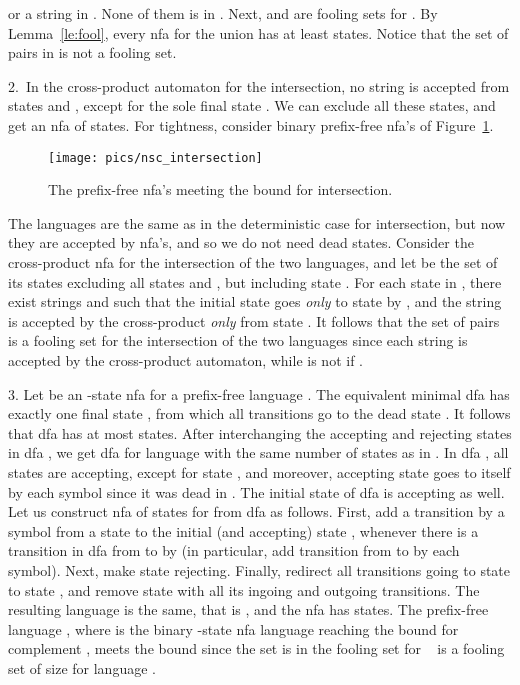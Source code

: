 \documentclass[copyright]{eptcs}
\begin{document}
   or a string in .
   None of them  is in .
   Next,  
   and 
   are fooling sets for .
   By Lemma~\ref{le:fool}, every nfa for the union
   has at least  states. 
   Notice that the set of pairs in \cite{hs09n} is not a fooling set. 

\label{nsc_intersection}
  2.~In the cross-product automaton for the intersection,
  no string is accepted from states  and ,
  except for the sole final state .
  We can exclude all these states, and get an nfa of  states.
  For tightness, consider binary prefix-free
   nfa's of Figure~\ref{fig:nsc_intersection}.
  \begin{figure}[tb]
  \centerline{\texttt{[image: pics/nsc\_intersection]}}
  \caption{The prefix-free  nfa's
           meeting the  bound  for intersection.}
  \label{fig:nsc_intersection}
  \end{figure}
  The languages are the same as in the deterministic case for intersection,
  but now they are accepted by nfa's, and so we do not need  dead states.
  Consider the cross-product nfa for the intersection of the two languages,
  and let  be the set of its  states excluding all states
   and , but including state .
   For each state  in ,
  there exist strings  and 
  such that the initial state goes \emph{only} to state  by ,
  and the string  is accepted by the cross-product \emph{only} 
  from state .
  It follows that  the set of pairs 
  is a fooling set for the intersection of the two languages
  since each string  is accepted by the cross-product automaton,
  while  is not if .

\label{part3}
  3. Let  be an -state  nfa for a prefix-free language .
  The equivalent minimal dfa  has exactly one final state ,
  from which all transitions go to the dead state .
  It follows that  dfa  has at most  states.
  After interchanging the accepting and rejecting states in dfa ,
  we get  dfa  for  language  
  with the same number of states as in  .
  In  dfa , all states are accepting, except for state ,
  and moreover, accepting state  goes to itself 
  by each symbol since it was dead in .
  The initial state  of  dfa  is accepting as well.
  Let us construct  nfa  of  states 
  for  from  dfa  as follows.
  First, add a transition by a symbol  from a state 
  to the initial (and accepting) state ,
  whenever  there is a transition in  dfa  from  to  by 
  (in particular,  add transition from  to  by each symbol).
  Next,   make state  rejecting. 
  Finally,  redirect all transitions going to state  to state ,
  and remove state  with all its ingoing and outgoing transitions. 
  The resulting language is  the same, that is ,
  and the nfa  has  states. 
  The prefix-free language , where  is the binary -state 
  nfa language   reaching the bound  for complement \cite{ji05},
  meets the bound since  the set
     is in the fooling set for \  \cite{ji05}
  is a fooling set of size  for language .
\end{document}
